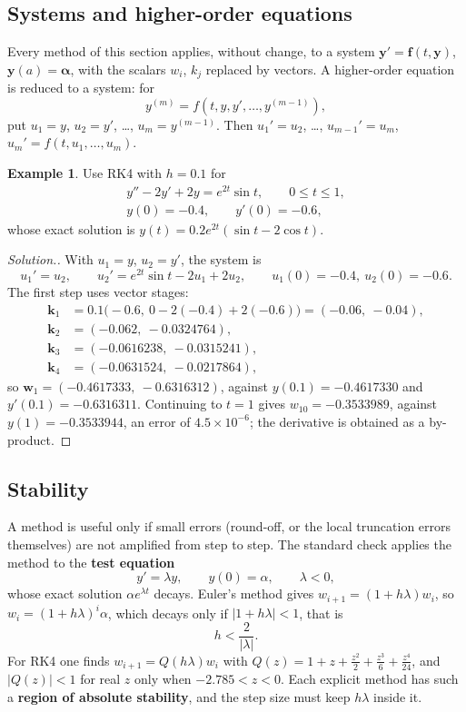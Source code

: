 \documentclass[11pt,a4paper]{article}
\numberwithin{equation}{section}
\theoremstyle{definition}
\newtheorem{exa}[thm]{Example}
\newenvironment{solution}
  {\renewcommand{\qedsymbol}{}\begin{proof}[\textit{Solution}.]}
  {\end{proof}}
\begin{document}
\subsection{Systems and higher-order equations}
\label{sec:systems}

Every method of this section applies, without change, to a system $\mathbf y' = \mathbf f(t,\mathbf y)$, $\mathbf y(a) = \boldsymbol\alpha$, with the scalars
$w_i$, $k_j$ replaced by vectors. A higher-order equation is reduced to a system: for
$$y^{(m)} = f\left(t,y,y',\dots,y^{(m-1)}\right),$$
put $u_1 = y$, $u_2 = y'$, \dots, $u_m = y^{(m-1)}$. Then $u_1' = u_2$, \dots, $u_{m-1}' = u_m$, $u_m' = f(t,u_1,\dots,u_m)$.

\begin{exa}
\label{exa:system}
Use RK4 with $h = 0.1$ for
\begin{gather*}
y''-2y'+2y = e^{2t}\sin t,\qquad 0\leq t\leq1,\\
y(0) = -0.4,\qquad y'(0) = -0.6,
\end{gather*}
whose exact solution is $y(t) = 0.2e^{2t}(\sin t-2\cos t)$.
\end{exa}

\begin{solution}
With $u_1 = y$, $u_2 = y'$, the system is
$$u_1' = u_2,\qquad u_2' = e^{2t}\sin t-2u_1+2u_2,\qquad u_1(0) = -0.4,\ u_2(0) = -0.6 .$$
The first step uses vector stages:
\begin{align*}
\mathbf k_1 &= 0.1\bigl(-0.6,\ 0-2(-0.4)+2(-0.6)\bigr) = (-0.06,\ -0.04),\\
\mathbf k_2 &= (-0.062,\ -0.0324764),\\
\mathbf k_3 &= (-0.0616238,\ -0.0315241),\\
\mathbf k_4 &= (-0.0631524,\ -0.0217864),
\end{align*}
so $\mathbf w_1 = (-0.4617333,\ -0.6316312)$, against $y(0.1) = -0.4617330$ and $y'(0.1) = -0.6316311$. Continuing to $t = 1$ gives
$w_{10} = -0.3533989$, against $y(1) = -0.3533944$, an error of $4.5\times10^{-6}$; the derivative is obtained as a by-product.
\end{solution}


\subsection{Stability}
\label{sec:stability}

A method is useful only if small errors (round-off, or the local truncation errors themselves) are not amplified from step to step. The
standard check applies the method to the \textbf{test equation}
$$y' = \lambda y,\qquad y(0) = \alpha,\qquad\lambda<0,$$
whose exact solution $\alpha e^{\lambda t}$ decays. Euler's method gives $w_{i+1} = (1+h\lambda)w_i$, so $w_i = (1+h\lambda)^i\alpha$, which decays only if
$|1+h\lambda|<1$, that is
$$h<\frac{2}{|\lambda|} .$$
For RK4 one finds $w_{i+1} = Q(h\lambda)w_i$ with $Q(z) = 1+z+\frac{z^2}2+\frac{z^3}6+\frac{z^4}{24}$, and $|Q(z)|<1$ for real $z$ only when
$-2.785<z<0$. Each explicit method has such a \textbf{region of absolute stability}, and the step size must keep $h\lambda$ inside it.
\end{document}
